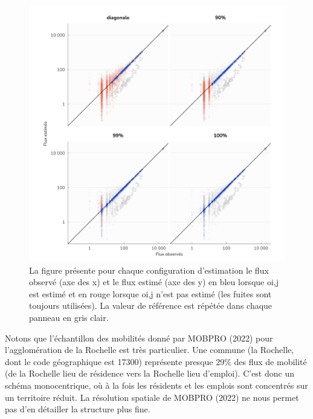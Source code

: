 \documentclass[
  10pt,
  a4paper,
  numbers=noendperiod,
  DIV=9]{scrreprt}
\begin{document}
\begin{figure}[htb]

{\centering \includegraphics[width=1\textwidth,height=\textheight]{./larochelle_files/figure-pdf/fig-actvsfit-np-1.png}

}

\caption[\emph{MEAPS} observés versus estimés]{\label{fig-actvsfit-np}La
figure présente pour chaque configuration d'estimation le flux observé
(axe des x) et le flux estimé (axe des y) en bleu lorsque oi,j est
estimé et en rouge lorsque oi,j n'est pas estimé (les fuites sont
toujours utilisées). La valeur de référence est répétée dans chaque
panneau en gris clair.}

\end{figure}

Notons que l'échantillon des mobilités donné par MOBPRO (2022) pour
l'agglomération de la Rochelle est très particulier. Une commune (la
Rochelle, dont le code géographique est 17300) représente presque 29\%
des flux de mobilité (de la Rochelle lieu de résidence vers la Rochelle
lieu d'emploi). C'est donc un schéma monocentrique, où à la fois les
résidents et les emplois sont concentrés sur un territoire réduit. La
résolution spatiale de MOBPRO (2022) ne nous permet pas d'en détailler
la structure plus fine.
\end{document}

